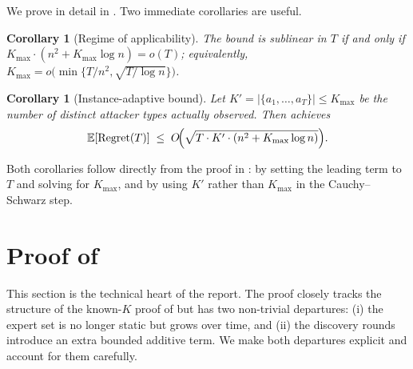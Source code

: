 \documentclass[letterpaper,9pt,twocolumn]{extarticle}
\newcommand{\EE}{\mathbb{E}}
\newcommand{\Kmax}{K_{\max}}
\newcommand{\Regret}{\mathrm{Regret}}
\theoremstyle{plain}
\newtheorem{corollary}[theorem]{Corollary}
\theoremstyle{definition}
\theoremstyle{remark}
\begin{document}
We prove  in detail in . Two immediate
corollaries are useful.

\begin{corollary}[Regime of applicability]
\label{cor:regime}
The bound  is sublinear in $T$ if and only if
$\Kmax\cdot(n^2+\Kmax\log n)=o(T)$; equivalently,
$\Kmax=o\!\bigl(\min\{T/n^2,\sqrt{T/\log n}\}\bigr)$.
\end{corollary}

\begin{corollary}[Instance-adaptive bound]
\label{cor:adaptive}
Let $K'=|\{a_1,\dots,a_T\}|\le\Kmax$ be the number of \emph{distinct}
attacker types actually observed. Then  achieves
\[
\EE[\Regret(T)]\;\le\;O\!\Bigl(\sqrt{T\cdot K'\cdot(n^2+\Kmax\log n)}\Bigr).
\]
\end{corollary}

Both corollaries follow directly from the proof in :
 by setting the leading term to $T$ and solving for
$\Kmax$, and  by using $K'$ rather than $\Kmax$ in the
Cauchy--Schwarz step.

\section{Proof of }
\label{sec:proof}

This section is the technical heart of the report. The proof closely
tracks the structure of the known-$K$ proof of \citet[\S 5]{balcan2015}
but has two non-trivial departures: (i) the expert set is no longer static
but grows over time, and (ii) the discovery rounds introduce an extra
bounded additive term. We make both departures explicit and account for
them carefully.
\end{document}
